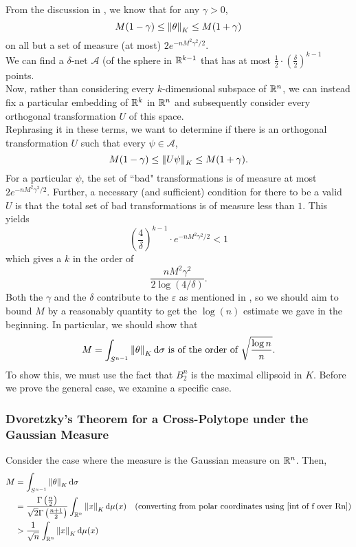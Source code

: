 From the discussion in , we know that for any $\gamma>0$,
\[ M(1-\gamma) \leq \left\lVert\theta\right\rVert_K \leq M(1+\gamma) \]
on all but a set of measure (at most) $2e^{-nM^2\gamma^2/2}$.\\
We can find a $\delta$-net $\mathcal{A}$ (of the sphere in $\mathbb{R}^{k-1}$ that has at most $\frac{1}{2}\cdot\left(\frac{\delta}{2}\right)^{k-1}$ points.\\
Now, rather than considering every $k$-dimensional subspace of $\mathbb{R}^n$, we can instead fix a particular embedding of $\mathbb{R}^k$ in $\mathbb{R}^n$ and subsequently consider every orthogonal transformation $U$ of this space.\\
Rephrasing it in these terms, we want to determine if there is an orthogonal transformation $U$ such that every $\psi\in\mathcal{A}$,
\[ M(1-\gamma) \leq \left\lVert U\psi\right\rVert_K \leq M(1+\gamma). \]
For a particular $\psi$, the set of ``bad" transformations is of measure at most $2e^{-nM^2\gamma^2/2}$. Further, a necessary (and sufficient) condition for there to be a valid $U$ is that the total set of bad transformations is of measure less than $1$. This yields
\[ \left(\frac{4}{\delta}\right)^{k-1} \cdot e^{-nM^2\gamma^2/2} < 1 \]
which gives a $k$ in the order of 
\[ \frac{nM^2\gamma^2}{2\log(4/\delta)}. \]
Both the $\gamma$ and the $\delta$ contribute to the $\varepsilon$ as mentioned in , so we should aim to bound $M$ by a reasonably quantity to get the $\log(n)$ estimate we gave in the beginning. In particular, we should show that
\[ M = \int_{S^{n-1}} \left\lVert\theta\right\rVert_K \operatorname{d}\!{\sigma} \text{ is of the order of } \sqrt{\frac{\log n}{n}}. \]
To show this, we must use the fact that $B_2^n$ is the maximal ellipsoid in $K$.
Before we prove the general case, we examine a specific case.

\subsubsection{Dvoretzky's Theorem for a Cross-Polytope under the Gaussian Measure}

Consider the case where the measure is the Gaussian measure on $\mathbb{R}^n$. Then,
\begin{align*}
    M &= \int_{S^{n-1}} \norm{\theta}_K \d\sigma \\
    &= \frac{\Gamma\left(\frac{n}{2}\right)}{\sqrt{2}\Gamma\left(\frac{n+1}{2}\right)} \int_{\R^n} \norm{x}_K \d\mu(x) & (\text{converting from polar coordinates using \Cref{int of f over Rn}}) \\
    &> \frac{1}{\sqrt{n}} \int_{\R^n} \norm{x}_K \d\mu(x)
\end{align*}

